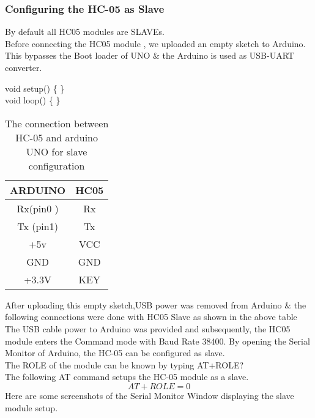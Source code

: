 \subsubsection*{Configuring the HC-05 as Slave}
By default all HC05 modules are SLAVEs.\\
Before connecting the HC05 module , we uploaded an empty sketch to Arduino. This bypasses the Boot loader of UNO $\&$ the Arduino is used as USB-UART converter.
\begin{flushleft}
void setup() \big\{ \big\}\\
void loop() \big\{ \big\}\\
\end{flushleft}
\begin{table}[h]
\begin{center}
\begin{tabular}{ |c|c| }
\hline 
 ARDUINO     &   HC05\\
 \hline
Rx(pin0 )  &Rx\\
\hline
Tx (pin1) &   Tx\\
\hline
+5v     & VCC\\
\hline
GND     & GND\\
\hline
+3.3V  & KEY\\
\hline
\end{tabular}
\caption{The connection between HC-05 and arduino UNO for slave configuration}
\end{center}
\end{table}
\justify After uploading this empty sketch,USB power was removed from Arduino $\&$ the following connections were done with HC05 Slave as shown in the above table\\
The USB cable power to Arduino was provided and subsequently, the HC05 module enters the Command mode with Baud Rate 38400.
By opening the Serial Monitor of Arduino, the HC-05 can be configured as slave.\\
The ROLE of the module can be known by typing  AT+ROLE?\\
The following AT command setups the HC-05 module as a slave.
\begin{equation}
AT+ROLE=0
\end{equation}
\justify Here are some screenshots of the Serial Monitor Window displaying the slave module setup.
\newpage 
